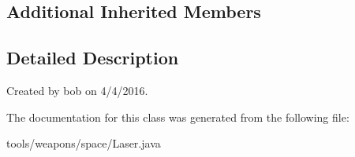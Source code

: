 \subsection*{Additional Inherited Members}


\subsection{Detailed Description}
Created by bob on 4/4/2016. 

The documentation for this class was generated from the following file\+:\begin{DoxyCompactItemize}
\item 
tools/weapons/space/Laser.\+java\end{DoxyCompactItemize}
